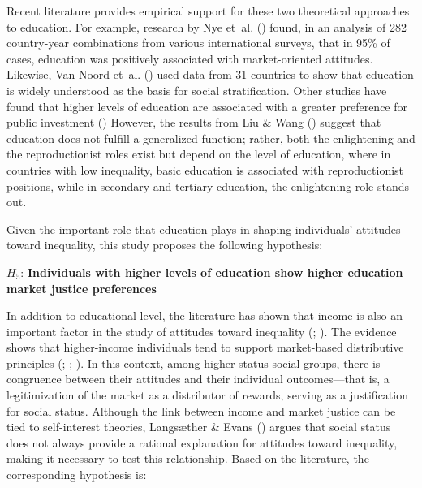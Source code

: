 \documentclass[
  spanish,
  a4paper,
  oneside]{scrbook}
\begin{document}
Recent literature provides empirical support for these two theoretical
approaches to education. For example, research by Nye et~al.
() found, in an analysis of 282
country-year combinations from various international surveys, that in
95\% of cases, education was positively associated with market-oriented
attitudes. Likewise, Van Noord et~al.
() used data from 31
countries to show that education is widely understood as the basis for
social stratification. Other studies have found that higher levels of
education are associated with a greater preference for public investment
() However, the
results from Liu \& Wang () suggest
that education does not fulfill a generalized function; rather, both the
enlightening and the reproductionist roles exist but depend on the level
of education, where in countries with low inequality, basic education is
associated with reproductionist positions, while in secondary and
tertiary education, the enlightening role stands out.

Given the important role that education plays in shaping individuals'
attitudes toward inequality, this study proposes the following
hypothesis:

\(H_{5}\): \textbf{Individuals with higher levels of education show
higher education market justice preferences}

In addition to educational level, the literature has shown that income
is also an important factor in the study of attitudes toward inequality
(;
). The evidence shows that
higher-income individuals tend to support market-based distributive
principles (; ;
). In this context,
among higher-status social groups, there is congruence between their
attitudes and their individual outcomes---that is, a legitimization of
the market as a distributor of rewards, serving as a justification for
social status. Although the link between income and market justice can
be tied to self-interest theories, Langsæther \& Evans
() argues that social status
does not always provide a rational explanation for attitudes toward
inequality, making it necessary to test this relationship. Based on the
literature, the corresponding hypothesis is:
\end{document}
